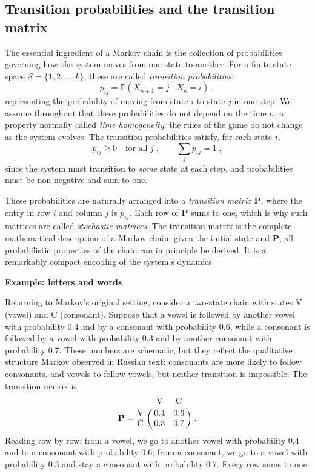 \subsection*{Transition probabilities and the transition matrix}

The essential ingredient of a Markov chain is the collection of probabilities governing how the system moves from one state to another. For a finite state space $\mathcal{S} = \{1, 2, \dots, k\}$, these are called \textit{transition probabilities}:
\begin{equation}
    p_{ij} = \mathbb{P}(X_{n+1} = j \mid X_n = i) \; ,
\end{equation}
representing the probability of moving from state $i$ to state $j$ in one step. We assume throughout that these probabilities do not depend on the time $n$, a property normally called \textit{time homogeneity}: the rules of the game do not change as the system evolves. The transition probabilities satisfy, for each state $i$,
\begin{equation}
    p_{ij} \ge 0 \quad \text{for all } j \; , \qquad \sum_{j} p_{ij} = 1 \; ,
\end{equation}
since the system must transition to \textit{some} state at each step, and probabilities must be non-negative and sum to one.

\medskip

These probabilities are naturally arranged into a \textit{transition matrix} $\mathbf{P}$, where the entry in row $i$ and column $j$ is $p_{ij}$. Each row of $\mathbf{P}$ sums to one, which is why such matrices are called \textit{stochastic matrices}. The transition matrix is the complete mathematical description of a Markov chain: given the initial state and $\mathbf{P}$, all probabilistic properties of the chain can in principle be derived. It is a remarkably compact encoding of the system's dynamics.

\medskip

\textbf{Example: letters and words} 

\medskip

Returning to Markov's original setting, consider a two-state chain with states V (vowel) and C (consonant). Suppose that a vowel is followed by another vowel with probability $0.4$ and by a consonant with probability $0.6$, while a consonant is followed by a vowel with probability $0.3$ and by another consonant with probability $0.7$. These numbers are schematic, but they reflect the qualitative structure Markov observed in Russian text: consonants are more likely to follow consonants, and vowels to follow vowels, but neither transition is impossible. The transition matrix is
\[
    \mathbf{P} = \bordermatrix{
        & \text{V} & \text{C} \cr
        \text{V} & 0.4 & 0.6 \cr
        \text{C} & 0.3 & 0.7
    } \; .
\]
Reading row by row: from a vowel, we go to another vowel with probability $0.4$ and to a consonant with probability $0.6$; from a consonant, we go to a vowel with probability $0.3$ and stay a consonant with probability $0.7$. Every row sums to one.

